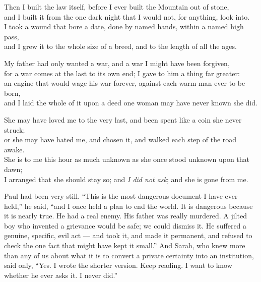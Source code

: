 \begin{scripture}
Then I built the law itself, before I ever built the Mountain out of stone, \\
and I built it from the one dark night that I would not, for anything, look into. \\
I took a wound that bore a date, done by named hands, within a named high pass, \\
and I grew it to the whole size of a breed, and to the length of all the ages. \\
\medskip

My father had only wanted a war, and a war I might have been forgiven, \\
for a war comes at the last to its own end; I gave to him a thing far greater: \\
an engine that would wage his war forever, against each warm man ever to be born, \\
and I laid the whole of it upon a deed one woman may have never known she did. \\
\medskip

She may have loved me to the very last, and been spent like a coin she never struck; \\
or she may have hated me, and chosen it, and walked each step of the road awake. \\
She is to me this hour as much unknown as she once stood unknown upon that dawn; \\
I arranged that she should stay so; and \emph{I did not ask}; and she is gone from me. \\
\end{scripture}

\ornament

Paul had been very still. ``This is the most dangerous document I have ever held,'' he said, ``and I once held a plan to end the world. It is dangerous because it is nearly true. He had a real enemy. His father was really murdered. A jilted boy who invented a grievance would be safe; we could dismiss it. He suffered a genuine, specific, evil act --- and took it, and made it permanent, and refused to check the one fact that might have kept it small.'' And Sarah, who knew more than any of us about what it is to convert a private certainty into an institution, said only, ``Yes. I wrote the shorter version. Keep reading. I want to know whether he ever asks it. I never did.''\par

\ornament

